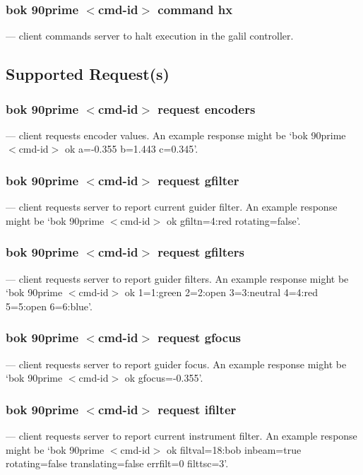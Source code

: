 \documentclass[12pt,twoside]{article}
\begin{document}
\subsubsection{bok 90prime $<$cmd-id$>$ command hx}
  --- client commands server to halt execution in the galil controller.
 
\subsection{Supported Request(s)}

\subsubsection{bok 90prime $<$cmd-id$>$ request encoders}
  --- client requests encoder values. An example response might be `{\sc bok 90prime $<$cmd-id$>$ ok a=-0.355 b=1.443 c=0.345}'.

\subsubsection{bok 90prime $<$cmd-id$>$ request gfilter}
  --- client requests server to report current guider filter. An example response might be `{\sc bok 90prime $<$cmd-id$>$ ok gfiltn=4:red rotating=false}'.

\subsubsection{bok 90prime $<$cmd-id$>$ request gfilters}
  --- client requests server to report guider filters. An example response might be `{\sc bok 90prime $<$cmd-id$>$ ok 1=1:green 2=2:open 3=3:neutral 4=4:red 5=5:open 6=6:blue}'.

\subsubsection{bok 90prime $<$cmd-id$>$ request gfocus}
  --- client requests server to report guider focus. An example response might be `{\sc bok 90prime $<$cmd-id$>$ ok gfocus=-0.355}'.

\subsubsection{bok 90prime $<$cmd-id$>$ request ifilter}
  --- client requests server to report current instrument filter. An example response might be `{\sc bok 90prime $<$cmd-id$>$ ok filtval=18:bob inbeam=true rotating=false translating=false errfilt=0 filttsc=3}'.
\end{document}
